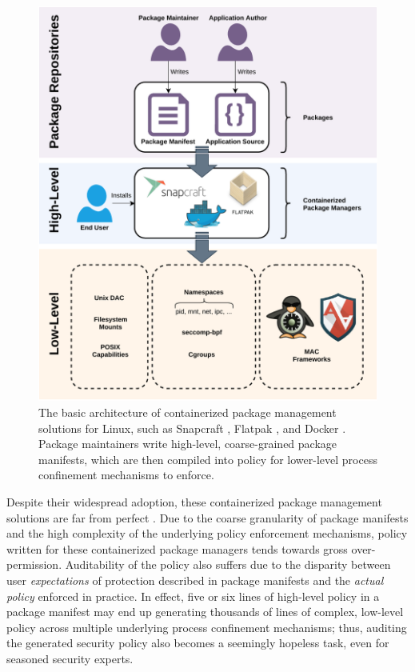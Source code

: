 \documentclass[dvipsnames, 12pt]{article}
\begin{document}
\begin{figure}[htpb]
    \centering
    \includegraphics[width=0.9\linewidth]{figs/high-level.pdf}
    \caption{
        The basic architecture of containerized package management solutions for
        Linux, such as Snapcraft \cite{snap}, Flatpak \cite{flatpak}, and Docker
        \cite{docker}. Package maintainers write high-level, coarse-grained
        package manifests, which are then compiled into policy for lower-level
        process confinement mechanisms to enforce.
    }%
    \label{fig:containerized}
\end{figure}

Despite their widespread adoption, these containerized package management
solutions are far from perfect \cite{sultan2019_container_security}. Due to the
coarse granularity of package manifests and the high complexity of the
underlying policy enforcement mechanisms, policy written for these containerized
package managers tends towards gross over-permission. Auditability of the policy
also suffers due to the disparity between user \textit{expectations} of
protection described in package manifests and the \textit{actual policy}
enforced in practice. In effect, five or six lines of high-level policy in
a package manifest may end up generating thousands of lines of complex,
low-level policy across multiple underlying process confinement mechanisms;
thus, auditing the generated security policy also becomes a seemingly hopeless
task, even for seasoned security experts.
\end{document}
